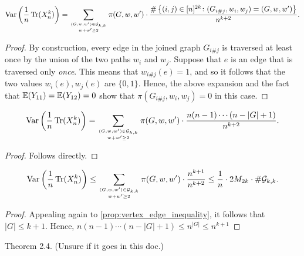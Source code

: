 \begin{proposition}
  \label{prop:var_trace_as_sum}
  \notready
  \[ \operatorname{Var}\left( \frac1n\operatorname{Tr}(X_n^k)\right) = \sum_{(G,w,w')\in \mathcal{G}_{k,k}\atop w+w'\ge 2} \pi(G,w,w')\cdot\frac{\#\left\{(i,{j})\in [n]^{2k}\colon (G_{i\#j},w_{i},w_{j}) = (G,w,w')\right\}}{n^{k+2}}. \]
\end{proposition}

\begin{proof}
  \notready
  By construction, every edge in the joined graph $G_{{i}\#{j}}$ is traversed at least once by the union of the two paths $w_{i}$ and $w_{j}$.  Suppose that $e$ is an edge that is traversed only {\em once}.  This means that $w_{{i}\#{j}}(e) = 1$, and so it follows that the two values $w_{i}(e),w_{j}(e)$ are $\{0,1\}$.  Hence, the above expansion and the fact that $\mathbb{E}(Y_{11})=\mathbb{E}(Y_{12})=0$ show that $\pi(G_{{i}\#{j}},w_{i},w_{j}) = 0$ in this case.
\end{proof}


\begin{lemma}
  \label{lem:simplified_var_trace_as_sum}
  \notready
  \[ \operatorname{Var}\left( \frac1n\operatorname{Tr}({X}_n^k)\right) = \sum_{(G,w,w')\in \mathcal{G}_{k,k}\atop w+w'\ge 2} \pi(G,w,w')\cdot\frac{n(n-1)\cdots (n-|G|+1)}{n^{k+2}}. \]
\end{lemma}

\begin{proof}
  \notready
  Follows directly.
\end{proof}


\begin{proposition}
  \label{prop:var_upper_bound}
  \notready
  \[ \operatorname{Var}\left( \frac1n\operatorname{Tr}({X}_n^k)\right) \le \sum_{(G,w,w')\in\mathcal{G}_{k,k}\atop w+w'\ge 2} \pi(G,w,w')\cdot \frac{n^{k+1}}{n^{k+2}} \le \frac1n\cdot 2M_{2k}\cdot \#\mathcal{G}_{k,k}. \]
\end{proposition}

\begin{proof}
  \notready
  Appealing again to \ref{prop:vertex_edge_inequality}, it follows that $|G|\le k+1$.  Hence, $n(n-1)\cdots(n-|G|+1) \le n^{|G|} \le n^{k+1}$
\end{proof}


\begin{theorem}
  \label{thm:wigner_law_matrix_moments}
  \notready
  Theorem 2.4. (Unsure if it goes in this doc.)
\end{theorem}

